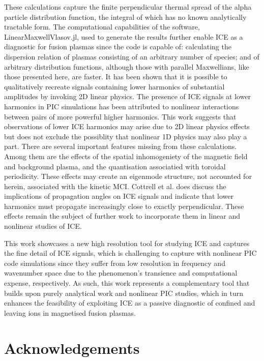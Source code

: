 \documentclass[12pt]{iopart}
\begin{document}
These calculations capture the finite perpendicular thermal spread of the alpha
particle distribution function, the integral of which has no known analytically
tractable form. The computational capabilities of the software,
LinearMaxwellVlasov.jl, used to generate the results further enable ICE as
a diagnostic for fusion plasmas since the code is capable of: calculating the
dispersion relation of plasmas consisting of an arbitrary number of species; and
of arbitrary distribution functions, although those with parallel Maxwellians,
like those presented here, are faster. It has been shown that it is possible to
qualitatively recreate signals containing lower harmonics of substantial amplitudes by
invoking 2D linear physics. The presence of ICE signals at lower harmonics in
PIC simulations has been attributed to nonlinear interactions between pairs of
more powerful higher harmonics\cite{Carbajal2014}. This work suggests that
observations of lower ICE harmonics may arise due to 2D
linear physics effects but does not exclude the possiblity that nonlinear 1D
physics\cite{Chapman2018} may also play a part.
There are several important features missing from these calculations. Among them
are the effects of the spatial inhomogeniety of the magnetic field and background
plasma, and the quantisation associatied with toroidal periodicity. These
effects may create an eigenmode structure, not accounted for herein,
associated with the kinetic MCI.
Cottrell et al. \cite{Cottrell1993} does discuss the implications of propagation
angles on ICE signals and indicate that lower harmonics must propagate
increasingly close to exactly perpendicular. These effects remain the subject of
further work to incorporate them in linear and nonlinear studies of ICE.

This work showcases a new high resolution tool for studying ICE and captures the
fine detail of ICE signals, which is challenging to capture with nonlinear PIC
code simulations since they suffer from low resolution in frequency and
wavenumber space due to the phenomenon's transience and computational expense,
respectively. As such, this work represents a complementary tool that builds
upon purely analytical work and nonlinear PIC studies, which in turn enhances
the feasibility of exploiting ICE as a passive diagnostic of confined and
leaving ions in magnetised fusion plasmas.

\section{Acknowledgements}
\end{document}
